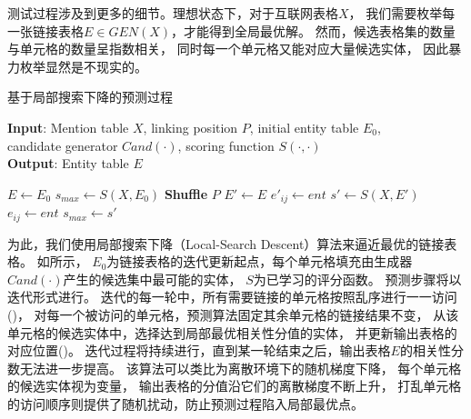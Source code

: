 测试过程涉及到更多的细节。理想状态下，对于互联网表格$X$，
我们需要枚举每一张链接表格$E \in GEN(X)$，才能得到全局最优解。
然而，候选表格集的数量与单元格的数量呈指数相关，
同时每一个单元格又能对应大量候选实体，
因此暴力枚举显然是不现实的。
%
%
\begin{algorithm}
	\caption{基于局部搜索下降的预测过程}
	\label{alg:tabel-prediction}
	\textbf{Input}: Mention table $X$, linking position $P$, initial entity table $E_0$,\\
	                candidate generator $Cand(\cdot)$, scoring function $S(\cdot,\cdot)$ \\
    \textbf{Output}: Entity table $E$
	\begin{algorithmic}[1]
		\State $E \gets E_0$
		\State $s_{max} \gets S(X, E_0)$
		\Repeat
            \State \textbf{Shuffle} $P$
    		 \label{line:visit}
	    	    \State $E' \gets E$
                    \State $e'_{ij} \gets ent$
		            \State $s' \gets S(X, E')$
                        \State $e_{ij} \gets ent$ \label{line:update}
                        \State $s_{max} \gets s'$
		            \EndIf
       		    \EndFor
		    \EndFor
		\State {}
		\EndProcedure
	\end{algorithmic}
\end{algorithm}

为此，我们使用局部搜索下降（Local-Search Descent）算法来逼近最优的链接表格。
如所示，
$E_0$为链接表格的迭代更新起点，每个单元格填充由生成器$Cand(\cdot)$产生的候选集中最可能的实体，
$S$为已学习的评分函数。
预测步骤将以迭代形式进行。
迭代的每一轮中，所有需要链接的单元格按照乱序进行一一访问()，
对每一个被访问的单元格，预测算法固定其余单元格的链接结果不变，
从该单元格的候选实体中，选择达到局部最优相关性分值的实体，
并更新输出表格的对应位置()。
迭代过程将持续进行，直到某一轮结束之后，输出表格$E$的相关性分数无法进一步提高。
该算法可以类比为离散环境下的随机梯度下降，
每个单元格的候选实体视为变量，
输出表格的分值沿它们的离散梯度不断上升，
打乱单元格的访问顺序则提供了随机扰动，防止预测过程陷入局部最优点。




